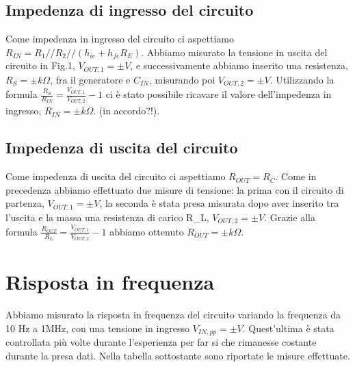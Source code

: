 \documentclass[10pt,a4paper]{article}
\begin{document}
\subsection{Impedenza di ingresso del circuito}
Come impedenza in ingresso del circuito ci aspettiamo $R_{IN}=R_1//R_2//(h_{ie}+h_{fe}R_E)$.
Abbiamo misurato la tensione in uscita del circuito in Fig.1, $V_{OUT,1}= \pm V$, e successivamente abbiamo inserito una resistenza, $R_S= \pm k\Omega$, fra il generatore e $C_{IN}$, misurando poi $V_{OUT,2}= \pm V$. Utilizzando la formula $\frac{R_S}{R_{IN}}=\frac{V_{OUT,1}}{V_{OUT,2}}-1$ ci è stato possibile ricavare il valore dell'impedenza in ingresso, $R_{IN}= \pm k\Omega$. (in accordo?!).

\subsection{Impedenza di uscita del circuito}
Come impedenza di uscita del circuito ci aspettiamo $R_{OUT}= R_C$. Come in precedenza abbiamo effettuato due misure di tensione: la prima con il circuito di partenza, $V_{OUT,1}= \pm V$, la seconda è stata presa misurata dopo aver inserito tra l'uscita e la massa una resistenza di carico R_L, $V_{OUT,2}= \pm V$. Grazie alla formula $\frac{R_{OUT}}{R_{L}}=\frac{V_{OUT,1}}{V_{OUT,2}}-1$ abbiamo ottenuto $R_{OUT}= \pm k\Omega$.

\section{Risposta in frequenza}
Abbiamo misurato la risposta in frequenza del circuito variando la frequenza da 10 Hz a 1MHz, con una tensione in ingresso $V_{IN,pp}= \pm V$. Quest'ultima è stata controllata più volte durante l'esperienza per far si che rimanesse costante durante la presa dati. Nella tabella sottostante sono riportate le misure effettuate.
\end{document}
